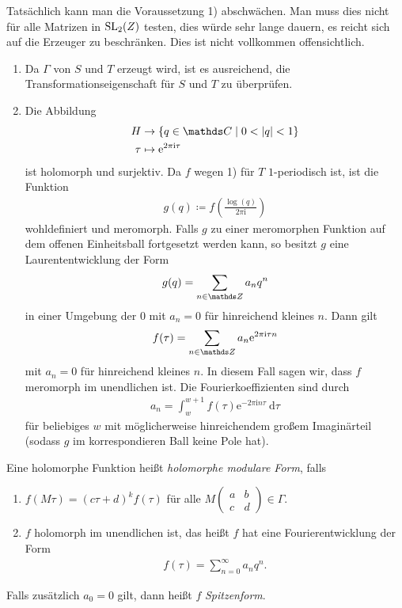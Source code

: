 Tatsächlich kann man die Voraussetzung 1) abschwächen.
Man muss dies nicht für alle Matrizen in $\operatorname{SL}_2(Z)$ testen,
dies würde sehr lange dauern, es reicht sich auf die Erzeuger zu beschränken.
Dies ist nicht vollkommen offensichtlich.
\begin{bem}
\begin{enumerate}[label=\arabic*)]
\item Da $\Gamma$ von $S$ und $T$ erzeugt wird, ist es ausreichend,
die Transformationseigenschaft für $S$ und $T$ zu überprüfen.
\item Die Abbildung
\begin{align*}
H&\to \{q \in \C \mid 0<\abs{q}<1\}\\
\tau &\mapsto \mathrm{e}^{2 \pi \mathrm{i}\tau}
\end{align*}
ist holomorph und surjektiv.
Da $f$ wegen 1) für $T$ $1$-periodisch ist, ist die Funktion
\begin{align*}
g(q)\coloneqq f\left( \frac{\log(q)}{2 \pi \mathrm{i}} \right)
\end{align*}
wohldefiniert und meromorph.
Falls $g$ zu einer meromorphen Funktion auf dem offenen Einheitsball fortgesetzt werden kann,
so besitzt $g$ eine Laurententwicklung der Form
\begin{align*}
g(q)=\sum_{n\in \Z} a_nq^n
\end{align*}
in einer Umgebung der $0$ mit $a_n=0$ für hinreichend kleines $n$. Dann gilt
\begin{align*}
f(\tau)=\sum_{n\in \Z} a_n \mathrm{e}^{2 \pi \mathrm{i} \tau n}
\end{align*}
mit $a_n=0$ für hinreichend kleines $n$.
In diesem Fall sagen wir, dass $f$ meromorph im unendlichen ist.
Die Fourierkoeffizienten sind durch
\begin{align*}
a_n =\int_w^{w+1} f(\tau)\mathrm{e}^{-2\pi \mathrm{i} n \tau}~\mathrm{d}\tau
\end{align*}
für beliebiges $w$ mit möglicherweise hinreichendem großem Imaginärteil (sodass $g$ im korrespondieren Ball keine Pole hat).
\end{enumerate}
\end{bem}

\begin{defi}
Eine holomorphe Funktion heißt \emph{holomorphe modulare Form}, falls
\begin{enumerate}[label=\arabic*)]
\item $f(M\tau)=(c\tau +d)^k f(\tau)$ für alle $M\begin{pmatrix}
a&b\\
c&d
\end{pmatrix} \in \Gamma$.
\item $f$ holomorph im unendlichen ist, das heißt $f$ hat eine Fourierentwicklung der Form
\begin{align*}
f(\tau)=\sum_{n=0}^\infty a_n q^n.
\end{align*}
\end{enumerate}
Falls zusätzlich $a_0=0$ gilt, dann heißt $f$ \emph{Spitzenform}.
\end{defi}

